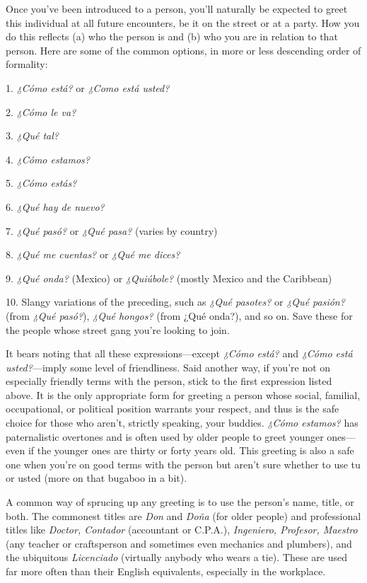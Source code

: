 Once you've been introduced to a person, you'll naturally be
expected to greet this individual at all future encounters, be it on the
street or at a party. How you do this reflects (a) who the person is and
(b) who you are in relation to that person. Here are some of the common options, in more or less descending order of formality:

\bsk

1. \emph{¿Cómo está?} or \emph{¿Como está usted?}

2. \emph{¿Cómo le va?}

3. \emph{¿Qué tal?}

4. \emph{¿Cómo estamos?}

5. \emph{¿Cómo estás?}

6. \emph{¿Qué hay de nuevo?}

7. \emph{¿Qué pasó?} or \emph{¿Qué pasa?} (varies by country)

8. \emph{¿Qué me cuentas?} or \emph{¿Qué me dices?}

9. \emph{¿Qué onda?} (Mexico) or \emph{¿Quiúbole?} (mostly Mexico and
the Caribbean)

10. Slangy variations of the preceding, such as \emph{¿Qué pasotes?}
or \emph{¿Qué pasión?} (from \emph{¿Qué pasó?}), \emph{¿Qué hongos?} (from ¿Qué onda?),
and so on. Save these for the people whose street gang you're looking
to join.

\bsk

It bears noting that all these expressions---except \emph{¿Cómo está?}
and \emph{¿Cómo está usted?}---imply some level of friendliness. Said another way, if you're not on especially friendly terms with the person,
stick to the first expression listed above. It is the only appropriate
form for greeting a person whose social, familial, occupational, or political position warrants your respect, and thus is the safe choice for
those who aren't, strictly speaking, your buddies. \emph{¿Cómo estamos?} has
paternalistic overtones and is often used by older people to greet
younger ones---even if the younger ones are thirty or forty years old.
This greeting is also a safe one when you're on good terms with the
person but aren't sure whether to use tu or usted (more on that bugaboo in a bit).

A common way of sprucing up any greeting is to use the person's name, title, or both. The commonest titles are \emph{Don} and \emph{Doña}
(for older people) and professional titles like \emph{Doctor, Contador} (accountant or C.P.A.), \emph{Ingeniero, Profesor, Maestro} (any teacher or craftsperson and sometimes even mechanics and plumbers), and the ubiquitous \emph{Licenciado} (virtually anybody who wears a tie). These are used far
more often than their English equivalents, especially in the workplace.

